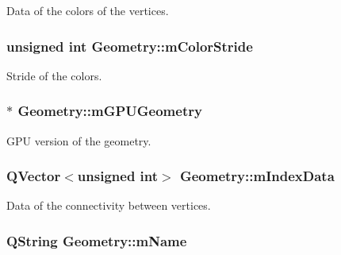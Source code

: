 Data of the colors of the vertices. 

\hypertarget{class_geometry_afa6ac722cc0fad9071d5802560250eb3}{
\subsubsection[{m\+Color\+Stride}]{\setlength{\rightskip}{0pt plus 5cm}unsigned int Geometry\+::m\+Color\+Stride\hspace{0.3cm}{\ttfamily [private]}}}\label{class_geometry_afa6ac722cc0fad9071d5802560250eb3}


Stride of the colors. 

\hypertarget{class_geometry_a9df7e43cff221adde5c369d21a1933b9}{
\subsubsection[{m\+G\+P\+U\+Geometry}]{$\ast$ Geometry\+::m\+G\+P\+U\+Geometry\hspace{0.3cm}{\ttfamily [private]}}}\label{class_geometry_a9df7e43cff221adde5c369d21a1933b9}


G\+P\+U version of the geometry. 

\hypertarget{class_geometry_ae0b8310174599d67910b0a5e33421106}{
\subsubsection[{m\+Index\+Data}]{\setlength{\rightskip}{0pt plus 5cm}Q\+Vector$<$unsigned int$>$ Geometry\+::m\+Index\+Data\hspace{0.3cm}{\ttfamily [private]}}}\label{class_geometry_ae0b8310174599d67910b0a5e33421106}


Data of the connectivity between vertices. 

\hypertarget{class_geometry_a9831671d273039dd55c23be1198540eb}{
\subsubsection[{m\+Name}]{\setlength{\rightskip}{0pt plus 5cm}Q\+String Geometry\+::m\+Name\hspace{0.3cm}{\ttfamily [private]}}}\label{class_geometry_a9831671d273039dd55c23be1198540eb}



